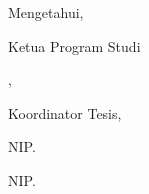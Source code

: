 \vspace{0.3cm}

{\centering Mengetahui,\par}

\vspace{0.55cm}
\noindent\hspace*{\dimexpr-\ttdgeser\relax}%
\parbox[t]{\ttdkolomA}{\raggedright\setlength{\baselineskip}{14pt}%
  Ketua Program Studi\par
  \programstudi{} \fakultassingkat\par
  \university,}%
\hspace*{\ttdgutter}%
\parbox[t]{\ttdkolomB}{\raggedright\setlength{\baselineskip}{14pt}%
  Koordinator Tesis,}\par
\vspace{1.0cm}
\noindent\hspace*{\dimexpr-\ttdgeser\relax}%
\parbox[t]{\ttdkolomA}{\raggedright\setlength{\baselineskip}{14pt}%
  \ttdnama[\ttdkolomA]{\kaprodi}\par
  \vspace{0.15cm}%
  NIP. \kaprodinip}%
\hspace*{\ttdgutter}%
\parbox[t]{\ttdkolomB}{\raggedright\setlength{\baselineskip}{14pt}%
  \ttdnama[\ttdkolomB]{\koordinatortesis}\par
  \vspace{0.15cm}%
  NIP. \koordinatortesisnip}